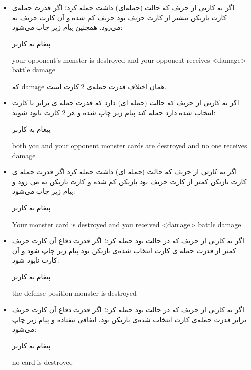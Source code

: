 \documentclass[]{article}
\begin{document}
\begin{itemize}
	\item
	اگر به کارتی از حریف که حالت  (حمله‌ای) داشت حمله کرد؛ اگر قدرت 
	حمله‌ی کارت بازیکن بیشتر از  کارت  حریف بود  حریف کم 
	شده و 
	آن کارت حریف به  می‌رود. همچنین پیام زیر چاپ می‌شود:
	\begin{mybox}[colback=yellow]{پیغام به کاربر}
		\begin{latin}	
			your opponent’s monster is destroyed and your opponent receives 
			<damage> battle damage	
		\end{latin}
	\end{mybox}
	        که damage همان اختلاف قدرت حمله‌ی 2 کارت است.
	
	\item
	اگر به کارتی از حریف که حالت  (حمله ای) دارد که قدرت حمله ی برابر 
	با کارت انتخاب شده دارد حمله کند پیام زیر چاپ شده و هر 2 کارت نابود 
	شوند:
	\begin{mybox}[colback=yellow]{پیغام به کاربر}
		\begin{latin}	
		    both you and your opponent monster cards are destroyed and no one 
		    receives damage	
		\end{latin}
	\end{mybox}

	\item
اگر به کارتی از حریف که حالت  (حمله ای) داشت حمله کرد اگر قدرت حمله ی 
کارت بازیکن کمتر از  کارت  حریف بود  بازیکن کم شده و 
کارت 
بازیکن به  می رود و پیام زیر چاپ می‌شود:
	\begin{mybox}[colback=yellow]{پیغام به کاربر}
	\begin{latin}	
		    Your monster card is destroyed and you received <damage> battle 
		    damage
	\end{latin}
	\end{mybox}

	\item
اگر به کارتی از حریف که در حالت  بود حمله کرد؛ اگر قدرت دفاع آن کارت 
حریف کمتر از قدرت حمله ی کارت انتخاب شده‌ی بازیکن بود پیام زیر چاپ شود و آن 
کارت نابود شود:
	\begin{mybox}[colback=yellow]{پیغام به کاربر}
	\begin{latin}	
	    the defense position monster is destroyed	
	\end{latin}
	\end{mybox}

	\item
اگر به کارتی از حریف که در حالت  بود حمله کرد؛ اگر قدرت دفاع آن کارت 
حریف برابر قدرت حمله‌ی کارت انتخاب شده‌ی بازیکن بود، اتفاقی نیفتاده و پیام 
زیر چاپ می‌شود:
	\begin{mybox}[colback=yellow]{پیغام به کاربر}
	\begin{latin}	
	    no card is destroyed	
	\end{latin}
	\end{mybox}


\end{itemize}
\end{document}
